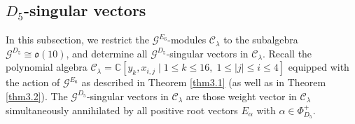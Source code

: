 \documentclass[12pt]{article}
\numberwithin{equation}{section}
\theoremstyle{definition}
\theoremstyle{remark}
\begin{document}
\subsection{${D_5}$-singular vectors}

In this subsection, we restrict the $\mathscr{G}^{E_6}$-modules $\mathscr{C}_{\lambda}$ to the subalgebra $\mathscr{G}^{D_5}\cong\mathfrak{o}(10)$, and determine all $\mathscr{G}^{D_5}$-singular vectors in $\mathscr{C}_{\lambda}$. 
Recall the polynomial algebra $\mathscr{C}_{\lambda}=\mathbb{C}[y_k,x_{i,j}\mid 1\leqslant k\leqslant 16,\; 1\leqslant |j|\leqslant i\leqslant 4]$ equipped with the action of $\mathscr{G}^{E_6}$ as described in Theorem \ref{thm3.1} (as well as in Theorem \ref{thm3.2}). The $\mathscr{G}^{D_5}$-singular vectors in $\mathscr{C}_{\lambda}$ are those weight vector in $\mathscr{C}_{\lambda}$ simultaneously annihilated by all positive root vectors $E_{\alpha}$ with $\alpha\in\Phi_{D_5}^+$. 
\end{document}
